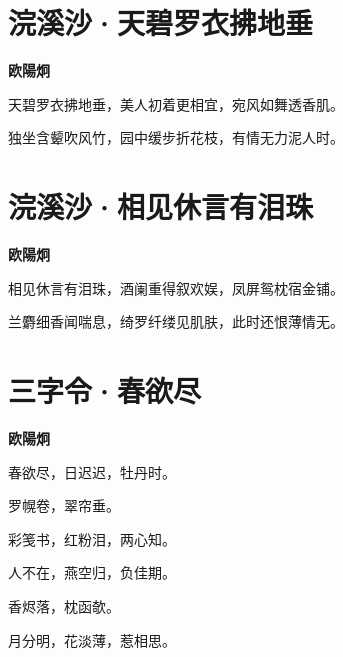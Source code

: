 \documentclass[12pt,a4paper]{ctexbook}
\begin{document}
\section{浣溪沙·天碧罗衣拂地垂}
\textbf{欧陽炯}\par\vspace{0.5em}
天碧罗衣拂地垂，美人初着更相宜，宛风如舞透香肌。\par
独坐含颦吹风竹，园中缓步折花枝，有情无力泥人时。\par

\section{浣溪沙·相见休言有泪珠}
\textbf{欧陽炯}\par\vspace{0.5em}
相见休言有泪珠，酒阑重得叙欢娱，凤屏鸳枕宿金铺。\par
兰麝细香闻喘息，绮罗纤缕见肌肤，此时还恨薄情无。\par

\section{三字令·春欲尽}
\textbf{欧陽炯}\par\vspace{0.5em}
春欲尽，日迟迟，牡丹时。\par
罗幌卷，翠帘垂。\par
彩笺书，红粉泪，两心知。\par
人不在，燕空归，负佳期。\par
香烬落，枕函欹。\par
月分明，花淡薄，惹相思。\par
\end{document}
